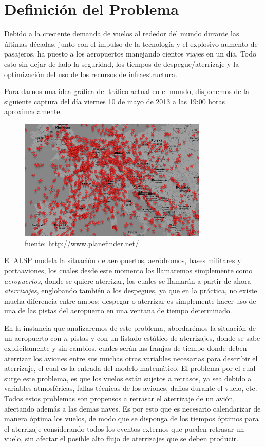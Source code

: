 \documentclass[letter, 11pt]{article}
\begin{document}
\section{Definición del Problema}
Debido a la creciente demanda de vuelos al rededor del mundo durante las últimas décadas, junto con el impulso de la tecnología y el explosivo aumento de pasajeros, ha puesto a los aeropuertos manejando cientos viajes en un día. Todo esto sin dejar de lado la seguridad, los tiempos de despegue/aterrizaje y la optimización del uso de los recursos de infraestructura.

Para darnos una idea gráfica del tráfico actual en el mundo, disponemos de la siguiente captura del día viernes 10 de mayo de 2013 a las 19:00 horas aproximadamente.
\begin{figure}[!h]
\centering
\includegraphics[width=9cm]{aviones.png}
\centering
\caption{fuente: http://www.planefinder.net/}
\end{figure}

El ALSP modela la situación de aeropuertos, aeródromos, bases militares y portaaviones, los cuales desde este momento los llamaremos simplemente como \textit{aeropuertos}, donde se quiere aterrizar, los cuales se llamarán a partir de ahora \textit{aterrizajes}, englobando también a los despegues, ya que en la práctica, no existe mucha diferencia entre ambos; despegar o aterrizar es simplemente hacer uso de una de las pistas del aeropuerto en una ventana de tiempo determinado.

En la instancia que analizaremos de este problema, abordarémos la situación de un aeropuerto con $n$ pistas y con un listado estático de aterrizajes, donde se sabe explicitamente y sin cambios, cuales serán las franjas de tiempo donde deben aterrizar los aviones entre sus muchas otras variables necesarias para describir el aterrizaje, el cual es la entrada del modelo matemático. El problema por el cual surge este problema, es que los vuelos están sujetos a retrasos, ya sea debido a variables atmosféricas, fallas técnicas de los aviones, daños durante el vuelo, etc. Todos estos problemas son propensos a retrasar el aterrizaje de un avión, afectando además a las demas naves. Es por esto que es necesario calendarizar de manera óptima los vuelos, de modo que se disponga de los tiempos óptimos para el aterrizaje considerando todos los eventos externos que pueden retrasar un vuelo, sin afectar el posible alto flujo de aterrizajes que se deben producir.
\end{document}
